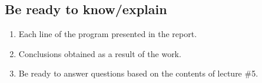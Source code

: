 { %
	\subsection{Be ready to know/explain}
	\begin{enumerate}
		\item Each line of the program presented in the report.
		\item Conclusions obtained as a result of the work.
		\item Be ready to answer questions based on the contents of lecture \#5.
	\end{enumerate}
}